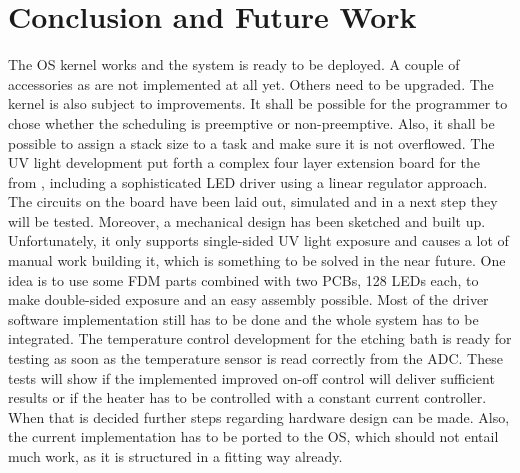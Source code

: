 
\chapter{Conclusion and Future Work}
\label{chap:conclusion}

The \gls{OS} kernel works and the system is ready to be deployed. A couple of accessories as are not implemented at all yet. Others need to be upgraded. The kernel is also subject to improvements. It shall be possible for the programmer to chose whether the scheduling is preemptive or non-preemptive. Also, it shall be possible to assign a stack size to a task and make sure it is not overflowed. 
\newpar 
The \gls{UV} light development put forth a complex four layer extension board for the  from , including a sophisticated \gls{LED} driver using a linear regulator approach. The circuits on the board have been laid out, simulated and in a next step they will be tested. Moreover, a mechanical design has been sketched and built up. Unfortunately, it only supports single-sided \gls{UV} light exposure and causes a lot of manual work building it, which is something to be solved in the near future. One idea is to use some \gls{FDM} parts combined with two \glspl{PCB}, 128 \glspl{LED} each, to make double-sided exposure and an easy assembly possible. Most of the driver software implementation still has to be done and the whole system has to be integrated. 
\newpar
The temperature control development for the etching bath is ready for testing as soon as the temperature sensor is read correctly from the \gls{ADC}. These tests will show if the implemented improved on-off control will deliver sufficient results or if the heater has to be controlled with a constant current controller. When that is decided further steps regarding hardware design can be made.
Also, the current implementation has to be ported to the \gls{OS}, which should not entail much work, as it is structured in a fitting way already. 